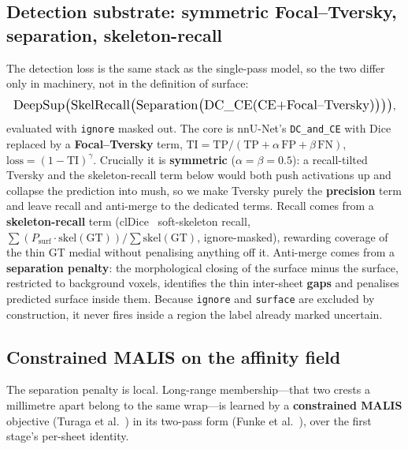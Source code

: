\documentclass[10pt,twocolumn,a4paper]{article}
\newcommand{\code}[1]{\texttt{#1}}
\begin{document}
\subsection{Detection substrate: symmetric Focal--Tversky, separation, skeleton-recall}
The detection loss is the same stack as the single-pass model, so the two differ
only in machinery, not in the definition of surface:
\begin{equation}
  \resizebox{\columnwidth}{!}{$\displaystyle
  \mathrm{DeepSup}\big(\mathrm{SkelRecall}\big(\mathrm{Separation}\big(\mathrm{DC\_CE}(\mathrm{CE}{+}\text{Focal--Tversky})\big)\big)\big)$},
\end{equation}
evaluated with \code{ignore} masked out. The core is nnU-Net's \code{DC\_and\_CE}
with Dice replaced by a \textbf{Focal--Tversky} term,
$\mathrm{TI}=\mathrm{TP}/(\mathrm{TP}+\alpha\,\mathrm{FP}+\beta\,\mathrm{FN})$,
$\mathrm{loss}=(1-\mathrm{TI})^\gamma$. Crucially it is \textbf{symmetric}
($\alpha=\beta=0.5$): a recall-tilted Tversky and the skeleton-recall term below
would both push activations up and collapse the prediction into mush, so we make
Tversky purely the \textbf{precision} term and leave recall and anti-merge to the
dedicated terms. Recall comes from a \textbf{skeleton-recall} term (clDice~\cite{cldice}
soft-skeleton recall,
$\sum(P_{\text{surf}}\cdot\mathrm{skel}(\mathrm{GT}))/\sum\mathrm{skel}(\mathrm{GT})$,
ignore-masked), rewarding coverage of the thin GT medial without penalising
anything off it. Anti-merge comes from a \textbf{separation penalty}: the
morphological closing of the surface minus the surface, restricted to background
voxels, identifies the thin inter-sheet \textbf{gaps} and penalises predicted
surface inside them. Because \code{ignore} and \code{surface} are excluded by
construction, it never fires inside a region the label already marked uncertain.

\subsection{Constrained MALIS on the affinity field}\label{sec:malis}
The separation penalty is local. Long-range membership---that two crests a
millimetre apart belong to the same wrap---is learned by a \textbf{constrained
MALIS} objective (Turaga et al.~\cite{turaga2009}) in its two-pass form (Funke et
al.~\cite{funke2018}), over the first stage's per-sheet identity.
\end{document}
